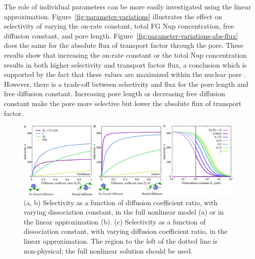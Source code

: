 The role of individual parameters can be more easily investigated using the linear approximation.  Figure~\ref{fig:parameter-variations} illustrates the effect on selectivity of varying the on-rate constant, total FG Nup concentration, free diffusion constant, and pore length.  Figure~\ref{fig:parameter-variations-abs-flux} does the same for the absolute flux of transport factor through the pore.  These results show that increasing the on-rate constant or the total Nup concentration results in both higher selectivity and transport factor flux, a conclusion which is supported by the fact that these values are maximized within the nuclear pore \cite{milles15, hough15}.  However, there is a trade-off between selectivity and flux for the pore length and free diffusion constant.  Increasing pore length or decreasing free diffusion constant make the pore more selective but lower the absolute flux of transport factor.

\begin{figure}
\centering
\includegraphics[width=\linewidth]{figs/ch02/linear-selectivity.pdf}
\caption{(a, b) Selectivity as a function of diffusion coefficient
  ratio, with varying dissociation constant, in the full nonlinear
  model (a) or in the linear approximation (b).  (c) Selectivity as a
  function of dissociation constant, with varying diffusion
  coefficient ratio, in the linear approximation.  The region to the
  left of the dotted line is non-physical; the full nonlinear solution
  should be used.}
\label{fig:linear-selectivity}
\end{figure}

